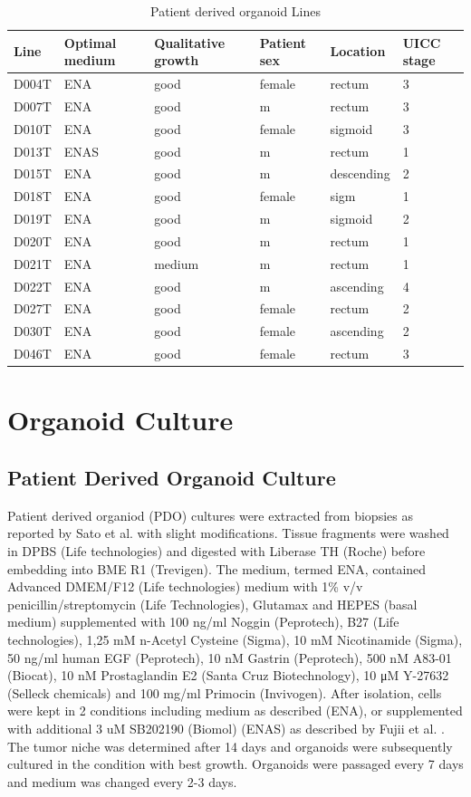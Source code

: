 \begin{flushleft}
\begin{table}[htbp]
\caption{Patient derived organoid Lines}
\label{tab:patient_organoid}
\begin{tabularx}{\textwidth}{lXXXXX}
\toprule
\textbf{Line} & \textbf{Optimal medium} & \textbf{Qualitative growth} & \textbf{Patient sex} & \textbf{Location} & \textbf{UICC stage} \\
\midrule
D004T & ENA & good & female & rectum & 3 \\
D007T & ENA & good & m & rectum & 3 \\
D010T & ENA & good & female & sigmoid & 3 \\
D013T & ENAS & good & m & rectum & 1 \\
D015T & ENA & good & m & descending & 2 \\
D018T & ENA & good & female & sigm & 1 \\
D019T & ENA & good & m & sigmoid & 2 \\
D020T & ENA & good & m & rectum & 1 \\
D021T & ENA & medium & m & rectum & 1 \\
D022T & ENA & good & m & ascending & 4 \\
D027T & ENA & good & female & rectum & 2 \\
D030T & ENA & good & female & ascending & 2 \\
D046T & ENA & good & female & rectum & 3 \\
\bottomrule
\end{tabularx}
\end{table}


\section{Organoid Culture}

\subsection{Patient Derived Organoid Culture}
Patient derived organiod (PDO) cultures were extracted from biopsies as reported by Sato et al. \parencite{satoLongtermExpansionEpithelial2011} with slight modifications. Tissue fragments were washed in DPBS (Life technologies) and digested with Liberase TH (Roche) before embedding into BME R1 (Trevigen). The medium, termed ENA, contained Advanced DMEM/F12 (Life technologies) medium with 1\% v/v penicillin/streptomycin (Life Technologies), Glutamax and HEPES (basal medium) supplemented with 100 ng/ml Noggin (Peprotech), B27 (Life technologies), 1,25 mM n-Acetyl Cysteine (Sigma), 10 mM Nicotinamide (Sigma), 50 ng/ml human EGF (Peprotech), 10 nM Gastrin (Peprotech), 500 nM A83-01 (Biocat), 10 nM Prostaglandin E2 (Santa Cruz Biotechnology), 10 μM Y-27632 (Selleck chemicals) and 100 mg/ml Primocin (Invivogen). After isolation, cells were kept in 2 conditions including medium as described (ENA), or supplemented with additional 3 uM SB202190 (Biomol) (ENAS) as described by Fujii et al. \parencite{Fujii2016-ax}. 
The tumor niche was determined after 14 days and organoids were subsequently cultured in the condition with best growth. 
Organoids were passaged every 7 days and medium was changed every 2-3 days.


\end{flushleft}
